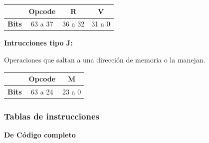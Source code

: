 \documentclass{article}
\begin{document}
\begin{table}[H]
  \centering
  \begin{tabular}{|c|c|c|c|}
    \hline
                  & \textbf{Opcode} & \textbf{R} & \textbf{V} \\ \hline
    \textbf{Bits} & 63 a 37         & 36 a 32    & 31 a 0     \\
    \hline
  \end{tabular}
\end{table}

\textbf{Intrucciones tipo J:}

Operaciones que saltan a una dirección de memoria o la manejan.

\begin{table}[H]
  \centering
  \begin{tabular}{|c|c|c|}
    \hline
                  & \textbf{Opcode} & \textbf{M} \\ \hline
    \textbf{Bits} & 63 a 24         & 23 a 0     \\
    \hline
  \end{tabular}
\end{table}

\subsubsection{Tablas de instrucciones}

\textbf{De Código completo}
\end{document}
